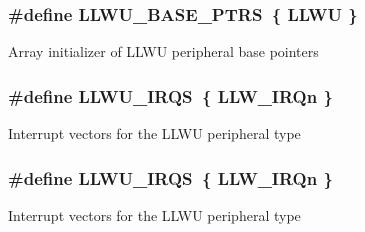 \subsubsection[{\texorpdfstring{L\+L\+W\+U\+\_\+\+B\+A\+S\+E\+\_\+\+P\+T\+RS}{LLWU_BASE_PTRS}}]{\setlength{\rightskip}{0pt plus 5cm}\#define L\+L\+W\+U\+\_\+\+B\+A\+S\+E\+\_\+\+P\+T\+RS~\{ {\bf L\+L\+WU} \}}\hypertarget{group__LLWU__Peripheral__Access__Layer_ga4826d688973513cc02a2f1d4f67c336b}{}\label{group__LLWU__Peripheral__Access__Layer_ga4826d688973513cc02a2f1d4f67c336b}
Array initializer of L\+L\+WU peripheral base pointers 
\subsubsection[{\texorpdfstring{L\+L\+W\+U\+\_\+\+I\+R\+QS}{LLWU_IRQS}}]{\setlength{\rightskip}{0pt plus 5cm}\#define L\+L\+W\+U\+\_\+\+I\+R\+QS~\{ {\bf L\+L\+W\+\_\+\+I\+R\+Qn} \}}\hypertarget{group__LLWU__Peripheral__Access__Layer_ga00f85a14dffe324ff8e867f8b06f1461}{}\label{group__LLWU__Peripheral__Access__Layer_ga00f85a14dffe324ff8e867f8b06f1461}
Interrupt vectors for the L\+L\+WU peripheral type 
\subsubsection[{\texorpdfstring{L\+L\+W\+U\+\_\+\+I\+R\+QS}{LLWU_IRQS}}]{\setlength{\rightskip}{0pt plus 5cm}\#define L\+L\+W\+U\+\_\+\+I\+R\+QS~\{ {\bf L\+L\+W\+\_\+\+I\+R\+Qn} \}}\hypertarget{group__LLWU__Peripheral__Access__Layer_ga00f85a14dffe324ff8e867f8b06f1461}{}\label{group__LLWU__Peripheral__Access__Layer_ga00f85a14dffe324ff8e867f8b06f1461}
Interrupt vectors for the L\+L\+WU peripheral type 